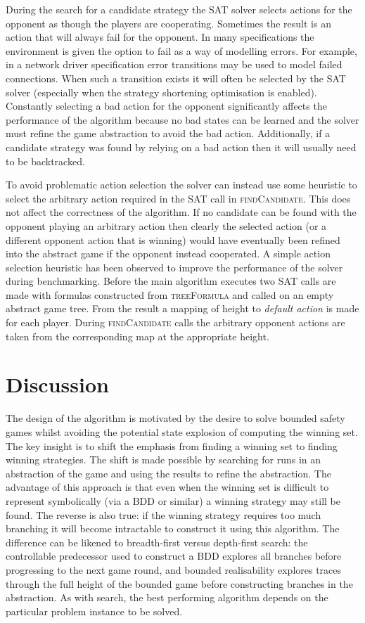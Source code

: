 During the search for a candidate strategy the SAT solver selects actions for the opponent as though the players are cooperating. Sometimes the result is an action that will always fail for the opponent. In many specifications the environment is given the option to fail as a way of modelling errors. For example, in a network driver specification error transitions may be used to model failed connections. When such a transition exists it will often be selected by the SAT solver (especially when the strategy shortening optimisation is enabled). Constantly selecting a bad action for the opponent significantly affects the performance of the algorithm because no bad states can be learned and the solver must refine the game abstraction to avoid the bad action. Additionally, if a candidate strategy was found by relying on a bad action then it will usually need to be backtracked. 

To avoid problematic action selection the solver can instead use some heuristic to select the arbitrary action required in the SAT call in \textsc{findCandidate}. This does not affect the correctness of the algorithm. If no candidate can be found with the opponent playing an arbitrary action then clearly the selected action (or a different opponent action that is winning) would have eventually been refined into the abstract game if the opponent instead cooperated. A simple action selection heuristic has been observed to improve the performance of the solver during benchmarking. Before the main algorithm executes two SAT calls are made with formulas constructed from \textsc{treeFormula} and \textsc{} called on an empty abstract game tree. From the result a mapping of height to \emph{default action} is made for each player. During \textsc{findCandidate} calls the arbitrary opponent actions are taken from the corresponding map at the appropriate height.


\section{Discussion}

The design of the algorithm is motivated by the desire to solve bounded safety games whilst avoiding the potential state explosion of computing the winning set. The key insight is to shift the emphasis from finding a winning set to finding winning strategies. The shift is made possible by searching for runs in an abstraction of the game and using the results to refine the abstraction. The advantage of this approach is that even when the winning set is difficult to represent symbolically (via a BDD or similar) a winning strategy may still be found. The reverse is also true: if the winning strategy requires too much branching it will become intractable to construct it using this algorithm. The difference can be likened to breadth-first versus depth-first search: the controllable predecessor used to construct a BDD explores all branches before progressing to the next game round, and bounded realisability explores traces through the full height of the bounded game before constructing branches in the abstraction. As with search, the best performing algorithm depends on the particular problem instance to be solved.

